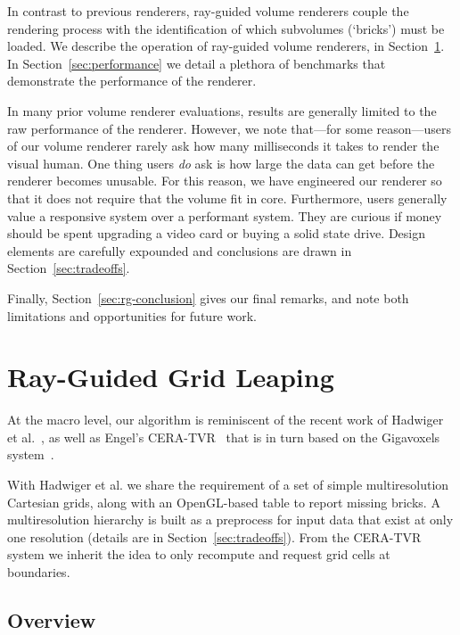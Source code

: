 In contrast to previous renderers, ray-guided volume renderers couple
the rendering process with the identification of which subvolumes
(`bricks') must be loaded.  We describe the operation of ray-guided
volume renderers, in Section~\ref{sec:algorithm}.
In Section~\ref{sec:performance} we detail a plethora of benchmarks
that demonstrate the performance of the renderer.

In many prior volume renderer evaluations, results are generally
limited to the raw performance of the renderer.  However, we note
that---for some reason---users of our volume renderer rarely ask how
many milliseconds it takes
to render the visual human.  One thing users \emph{do} ask is how large
the data can get before the renderer becomes unusable. For this reason,
we have engineered our renderer so that it does not require that the
volume fit in core.  Furthermore, users generally value a responsive
system over a performant system.  They are curious if money should be
spent upgrading a video card or buying a solid state drive.  Design
elements are carefully expounded and conclusions are drawn in
Section~\ref{sec:tradeoffs}.

Finally, Section~\ref{sec:rg-conclusion} gives our final remarks, and note
both limitations and opportunities for future work.

\section{Ray-Guided Grid Leaping}
\label{sec:algorithm}

At the macro level, our algorithm is reminiscent of the recent work of
Hadwiger et
al.~\cite{Hadwiger:2012:Guided}, as well as Engel's
CERA-TVR~\cite{Engel:2012:CERA} that is in turn based on the Gigavoxels
system~\cite{Crassin:2009:Gigavoxels}.

With Hadwiger et al. we share the requirement of a set of simple
multiresolution Cartesian grids, along with an OpenGL-based table
to report missing bricks.  A multiresolution hierarchy is built as a
preprocess for input data that exist at only one resolution (details
are in Section~\ref{sec:tradeoffs}).  From the CERA-TVR system
we inherit the idea to only recompute and request grid cells at
boundaries.

\subsection{Overview}

